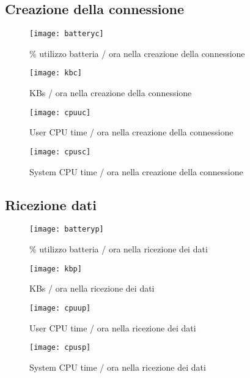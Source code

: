 \subsection{Creazione della connessione}
\label{app:charCreazione}

\begin{figure}[H]
  \centering
  \texttt{[image: batteryc]}
  \caption{\% utilizzo batteria / ora nella creazione della connessione}
  \label{fig:batteryc}
\end{figure}

\begin{figure}[H]
  \centering
  \texttt{[image: kbc]}
  \caption{KBs / ora nella creazione della connessione}
  \label{fig:kbc}
\end{figure}

\begin{figure}[H]
  \centering
  \texttt{[image: cpuuc]}
  \caption{User CPU time / ora nella creazione della connessione}
  \label{fig:cpuuc}
\end{figure}

\begin{figure}[H]
  \centering
  \texttt{[image: cpusc]}
  \caption{System CPU time / ora nella creazione della connessione}
  \label{fig:cpusc}
\end{figure}

\subsection{Ricezione dati}
\label{app:charRicezione}

\begin{figure}[H]
  \centering
  \texttt{[image: batteryp]}
  \caption{\% utilizzo batteria / ora nella ricezione dei dati}
  \label{fig:batteryp}
\end{figure}

\begin{figure}[H]
  \centering
  \texttt{[image: kbp]}
  \caption{KBs / ora nella ricezione dei dati}
  \label{fig:kbp}
\end{figure}

\begin{figure}[H]
  \centering
  \texttt{[image: cpuup]}
  \caption{User CPU time / ora nella ricezione dei dati}
  \label{fig:cpuup}
\end{figure}

\begin{figure}[H]
  \centering
  \texttt{[image: cpusp]}
  \caption{System CPU time / ora nella ricezione dei dati}
  \label{fig:cpusp}
\end{figure}
